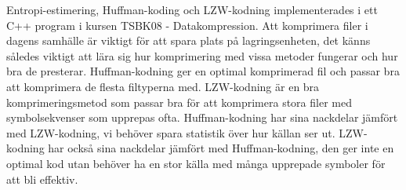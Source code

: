 
\noindent Entropi-estimering, Huffman-koding och LZW-kodning implementerades i ett C++ program i kursen TSBK08 - Datakompression. Att komprimera filer i dagens samhälle är viktigt för att spara plats på lagringsenheten, det känns således viktigt att lära sig hur komprimering med vissa metoder fungerar och hur bra de presterar. Huffman-kodning ger en optimal komprimerad fil och passar bra att komprimera de flesta filtyperna med. LZW-kodning är en bra komprimeringsmetod som passar bra för att komprimera stora filer med symbolsekvenser som upprepas ofta. Huffman-kodning har sina nackdelar jämfört med LZW-kodning, vi behöver spara statistik över hur källan ser ut. LZW-kodning har också sina nackdelar jämfört med Huffman-kodning, den ger inte en optimal kod utan behöver ha en stor källa med många upprepade symboler för att bli effektiv.



